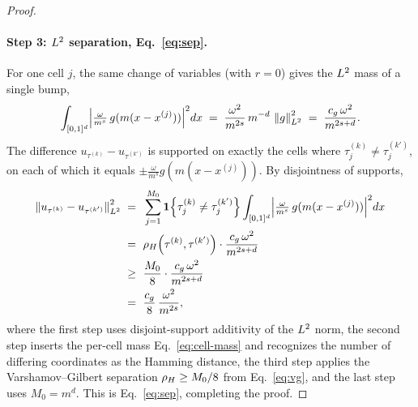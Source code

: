 \begin{proof}
\paragraph{Step 3: $L^{2}$ separation, Eq.~\eqref{eq:sep}.}
For one cell $j$, the same change of variables (with $r=0$) gives the $L^{2}$
mass of a single bump,
\begin{align}\label{eq:cell-mass}
\int_{[0,1]^d}\Bigl|\tfrac{\omega}{m^{s}}\,g(m(x-x^{(j)}))\Bigr|^2 dx
\;=\; \frac{\omega^2}{m^{2s}}\,m^{-d}\,\left\| g \right\|_{L^{2}}^2
\;=\; \frac{c_g\,\omega^2}{m^{2s+d}}.
\end{align}
The difference $u_{\tau^{(k)}}-u_{\tau^{(k')}}$ is supported on exactly the
cells where $\tau^{(k)}_j\ne\tau^{(k')}_j$, on each of which it equals
$\pm\tfrac{\omega}{m^{s}}g(m(x-x^{(j)}))$. By disjointness of supports,
\begin{align*}
\left\| u_{\tau^{(k)}}-u_{\tau^{(k')}} \right\|_{L^{2}}^2
\;=\; & ~ \sum_{j=1}^{M_0}\mathbf{1}\!\left\{\tau^{(k)}_j\ne\tau^{(k')}_j\right\}
        \int_{[0,1]^d}\Bigl|\tfrac{\omega}{m^{s}}\,g(m(x-x^{(j)}))\Bigr|^2 dx \\
\;=\; & ~ \rho_{H}\!\left(\tau^{(k)},\tau^{(k')}\right)\cdot\frac{c_g\,\omega^2}{m^{2s+d}} \\
\;\ge\; & ~ \frac{M_0}{8}\cdot\frac{c_g\,\omega^2}{m^{2s+d}} \\
\;=\; & ~ \frac{c_g}{8}\,\frac{\omega^2}{m^{2s}},
\end{align*}
where the first step uses disjoint-support additivity of the $L^{2}$ norm, the
second step inserts the per-cell mass Eq.~\eqref{eq:cell-mass} and recognizes the
number of differing coordinates as the Hamming distance, the third step
applies the Varshamov--Gilbert separation $\rho_{H}\ge M_0/8$ from Eq.~\eqref{eq:vg},
and the last step uses $M_0=m^d$. This is Eq.~\eqref{eq:sep}, completing the proof.
\end{proof}
